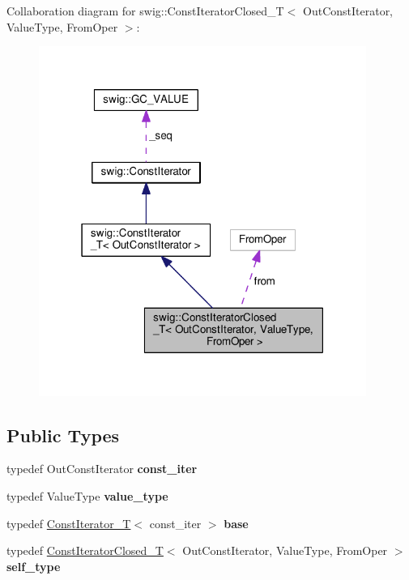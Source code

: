 Collaboration diagram for swig\+:\+:Const\+Iterator\+Closed\+\_\+T$<$ Out\+Const\+Iterator, Value\+Type, From\+Oper $>$\+:
\nopagebreak
\begin{figure}[H]
\begin{center}
\leavevmode
\includegraphics[width=303pt]{classswig_1_1ConstIteratorClosed__T__coll__graph}
\end{center}
\end{figure}
\subsection*{Public Types}
\begin{DoxyCompactItemize}
\item 
typedef Out\+Const\+Iterator {\bfseries const\+\_\+iter}\hypertarget{classswig_1_1ConstIteratorClosed__T_aae6fb18297131ab03688eccdea410340}{}\label{classswig_1_1ConstIteratorClosed__T_aae6fb18297131ab03688eccdea410340}

\item 
typedef Value\+Type {\bfseries value\+\_\+type}\hypertarget{classswig_1_1ConstIteratorClosed__T_ab21e0d4ef38bcb907d1916b342fe1fa6}{}\label{classswig_1_1ConstIteratorClosed__T_ab21e0d4ef38bcb907d1916b342fe1fa6}

\item 
typedef \hyperlink{classswig_1_1ConstIterator__T}{Const\+Iterator\+\_\+T}$<$ const\+\_\+iter $>$ {\bfseries base}\hypertarget{classswig_1_1ConstIteratorClosed__T_a9f6b585d5e3000f1b4dc3314860fba1e}{}\label{classswig_1_1ConstIteratorClosed__T_a9f6b585d5e3000f1b4dc3314860fba1e}

\item 
typedef \hyperlink{classswig_1_1ConstIteratorClosed__T}{Const\+Iterator\+Closed\+\_\+T}$<$ Out\+Const\+Iterator, Value\+Type, From\+Oper $>$ {\bfseries self\+\_\+type}\hypertarget{classswig_1_1ConstIteratorClosed__T_a490f3ef800a9abcd31a2102e2c97ea14}{}\label{classswig_1_1ConstIteratorClosed__T_a490f3ef800a9abcd31a2102e2c97ea14}

\end{DoxyCompactItemize}
